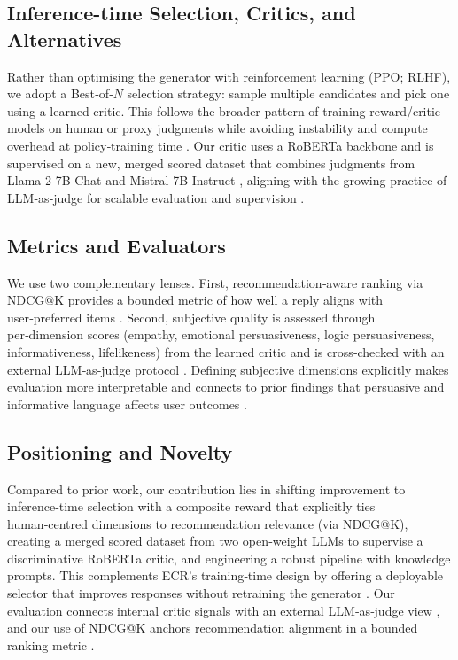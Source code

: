 \documentclass[12pt]{article}
\begin{document}
  \subsection{Inference-time Selection, Critics, and Alternatives}
  Rather than optimising the generator with reinforcement learning (PPO; RLHF), we adopt a Best‑of‑$N$ selection strategy: sample multiple candidates and pick one using a learned critic. This follows the broader pattern of training reward/critic models on human or proxy judgments \citep{rlhf_wikipedia} while avoiding instability and compute overhead at policy‑training time \citep{ppo_wikipedia}. Our critic uses a RoBERTa backbone \citep{liu2019roberta} and is supervised on a new, merged scored dataset that combines judgments from Llama‑2‑7B‑Chat and Mistral‑7B‑Instruct \citep{meta2023llama2,mistral2023}, aligning with the growing practice of LLM‑as‑judge for scalable evaluation and supervision \citep{yan2023llmjudge}.
  
  \subsection{Metrics and Evaluators}
  We use two complementary lenses. First, recommendation‑aware ranking via NDCG@K provides a bounded metric of how well a reply aligns with user‑preferred items \citep{evidently_ndcg}. Second, subjective quality is assessed through per‑dimension scores (empathy, emotional persuasiveness, logic persuasiveness, informativeness, lifelikeness) from the learned critic and is cross‑checked with an external LLM‑as‑judge protocol \citep{yan2023llmjudge,evidently_llm_judge}. Defining subjective dimensions explicitly makes evaluation more interpretable and connects to prior findings that persuasive and informative language affects user outcomes \citep{li2020empdg,anthropic_persuasion}.
  
  \subsection{Positioning and Novelty}
  Compared to prior work, our contribution lies in shifting improvement to inference‑time selection with a composite reward that explicitly ties human‑centred dimensions to recommendation relevance (via NDCG@K), creating a merged scored dataset from two open‑weight LLMs to supervise a discriminative RoBERTa critic, and engineering a robust pipeline with knowledge prompts. This complements ECR's training‑time design by offering a deployable selector that improves responses without retraining the generator \citep{zhang2024ecr,meta2023llama2,mistral2023}. Our evaluation connects internal critic signals with an external LLM‑as‑judge view \citep{yan2023llmjudge}, and our use of NDCG@K anchors recommendation alignment in a bounded ranking metric \citep{evidently_ndcg}.
  
\end{document}
